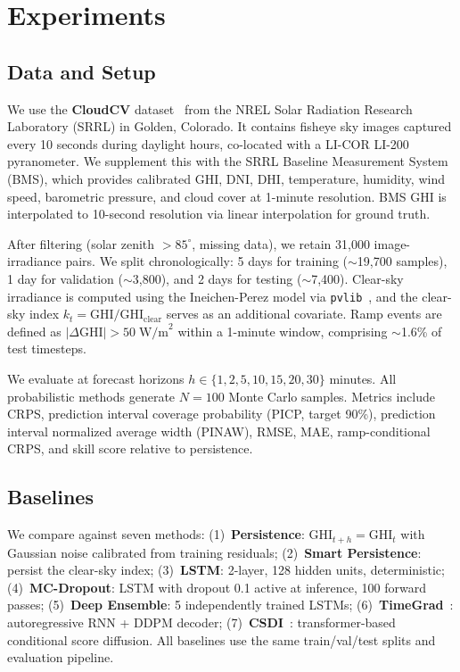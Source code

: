 \documentclass{article}
\begin{document}
\section{Experiments}
\label{sec:experiments}

\subsection{Data and Setup}
\label{sec:data}

We use the \textbf{CloudCV} dataset~\citep{perrsauer2024cloudcv} from the NREL Solar Radiation Research Laboratory (SRRL) in Golden, Colorado. It contains fisheye sky images captured every 10 seconds during daylight hours, co-located with a LI-COR LI-200 pyranometer. We supplement this with the SRRL Baseline Measurement System (BMS), which provides calibrated GHI, DNI, DHI, temperature, humidity, wind speed, barometric pressure, and cloud cover at 1-minute resolution. BMS GHI is interpolated to 10-second resolution via linear interpolation for ground truth.

After filtering (solar zenith $> 85^\circ$, missing data), we retain 31,000 image-irradiance pairs. We split chronologically: 5 days for training ($\sim$19,700 samples), 1 day for validation ($\sim$3,800), and 2 days for testing ($\sim$7,400). Clear-sky irradiance is computed using the Ineichen-Perez model via \texttt{pvlib}~\citep{holmgren2018pvlib}, and the clear-sky index $k_t = \text{GHI}/\text{GHI}_{\text{clear}}$ serves as an additional covariate. Ramp events are defined as $|\Delta\text{GHI}| > 50\;\text{W/m}^2$ within a 1-minute window, comprising $\sim$1.6\% of test timesteps.

We evaluate at forecast horizons $h \in \{1, 2, 5, 10, 15, 20, 30\}$ minutes. All probabilistic methods generate $N = 100$ Monte Carlo samples. Metrics include CRPS, prediction interval coverage probability (PICP, target 90\%), prediction interval normalized average width (PINAW), RMSE, MAE, ramp-conditional CRPS, and skill score relative to persistence.

\subsection{Baselines}

We compare against seven methods: (1)~\textbf{Persistence}: $\text{GHI}_{t+h} = \text{GHI}_t$ with Gaussian noise calibrated from training residuals; (2)~\textbf{Smart Persistence}: persist the clear-sky index; (3)~\textbf{LSTM}: 2-layer, 128 hidden units, deterministic; (4)~\textbf{MC-Dropout}: LSTM with dropout 0.1 active at inference, 100 forward passes; (5)~\textbf{Deep Ensemble}: 5 independently trained LSTMs; (6)~\textbf{TimeGrad}~\citep{rasul2021timegrad}: autoregressive RNN + DDPM decoder; (7)~\textbf{CSDI}~\citep{tashiro2021csdi}: transformer-based conditional score diffusion. All baselines use the same train/val/test splits and evaluation pipeline.
\end{document}
